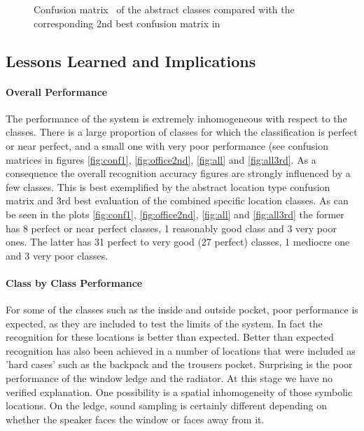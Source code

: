 \begin{figure}[t]
  \begin{center}
  \end{center}
\caption[Confusion matrices for the abstract classes]{ Confusion matrix~ of the abstract classes
 compared with the corresponding 2nd best confusion matrix
 in~} \label{fig:confmasurf} \end{figure}



\subsection{Lessons Learned and Implications} 


\paragraph{Overall Performance}
The performance of the system is extremely inhomogeneous with respect
to the classes. There is a large proportion of classes for which the
classification is perfect or near perfect, and a small one with very
poor performance (see confusion matrices in figures \ref{fig:conf1},
\ref{fig:office2nd}, \ref{fig:all} and \ref{fig:all3rd}. As a
consequence the overall recognition accuracy figures are strongly
influenced by a few classes. This
is best exemplified by the abstract location type confusion matrix and
3rd best evaluation of the combined specific location classes. As can
be seen in the plots \ref{fig:conf1}, \ref{fig:office2nd},
\ref{fig:all} and \ref{fig:all3rd} the former has 8 perfect or near
perfect classes, 1 reasonably good class and 3 very poor ones. The
latter has 31 perfect to very good (27 perfect) classes, 1 mediocre
one and 3 very poor classes.
 

\paragraph{Class by Class Performance}
For some of the classes such as the inside and outside pocket, poor
performance is expected, as they are included to test the limits of
the system. In fact the recognition for these locations is better than
expected. Better than expected recognition has also been achieved in a
number of locations that were included as 'hard cases' such as the
backpack and the trousers pocket. Surprising is the poor performance
of the window ledge and the radiator. At this stage we have no
verified explanation. One possibility is a spatial inhomogeneity of
those symbolic locations. On the ledge, sound sampling is certainly
different depending on whether the speaker faces the window or faces
away from it. 
 
